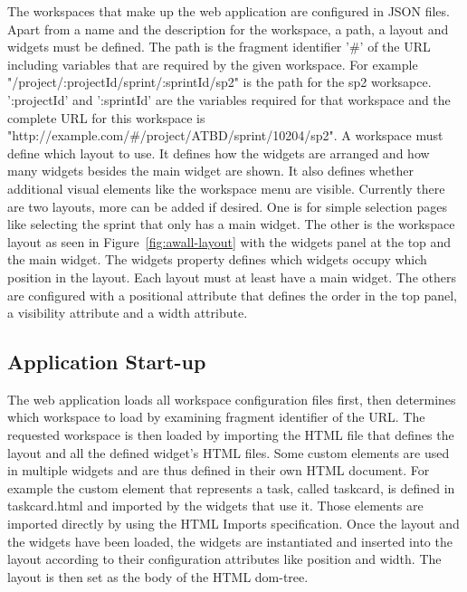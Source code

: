 \documentclass{sigchi}
\begin{document}
The workspaces that make up the web application are configured in JSON files. 
Apart from a name and the description for the workspace, a path, a layout and widgets must be defined. 
The path is the fragment identifier '\#' of the URL including variables that are required by the given workspace.
For example "/project/:projectId/sprint/:sprintId/sp2" is the path for the \gls{sp2} worksapce.
':projectId' and ':sprintId' are the variables required for that workspace and the complete URL for this workspace is "http://example.com/\#/project/ATBD/sprint/10204/sp2".
A workspace must define which layout to use.
It defines how the widgets are arranged and how many widgets besides the main widget are shown.
It also defines whether additional visual elements like the workspace menu are visible.
Currently there are two layouts, more can be added if desired.
One is for simple selection pages like selecting the sprint that only has a main widget.
The other is the workspace layout as seen in Figure~\ref{fig:awall-layout} with the widgets panel at the top and the main widget.
The widgets property defines which widgets occupy which position in the layout.
Each layout must at least have a main widget.
The others are configured with a positional attribute that defines the order in the top panel, a visibility attribute and a width attribute.

\subsection{Application Start-up}
The web application loads all workspace configuration files first, then determines which workspace to load by examining fragment identifier of the URL.
The requested workspace is then loaded by importing the HTML file that defines the layout and all the defined widget's HTML files.
Some custom elements are used in multiple widgets and are thus defined in their own HTML document.
For example the custom element that represents a task, called taskcard, is defined in taskcard.html and imported by the widgets that use it.
Those elements are imported directly by using the HTML Imports specification.
Once the layout and the widgets have been loaded, the widgets are instantiated and inserted into the layout according to their configuration attributes like position and width.
The layout is then set as the body of the HTML \gls{dom}-tree.
\end{document}
